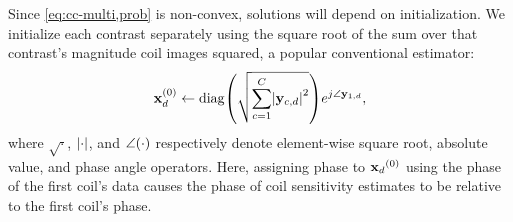 Since \eqref{eq:cc-multi,prob} is non-convex,
solutions will depend on initialization.
We initialize each contrast separately
using the square root of the sum 
over that contrast's magnitude coil images squared,
a popular conventional estimator:
\begin{align}
	\iter{\bmx}{0}_d \gets
		\diag{\sqrt{\sum_{c=1}^C \abs{\bmy_{c,d}}^2}}
		e^{j \angle{\bmy_{1,d}}},
	\label{eq:cc-multi,x-init}
\end{align}
where $\sqrt{\cdot}$, $\abs{\cdot}$, and $\angle{\paren{\cdot}}$
respectively denote 
element-wise square root, absolute value, and phase angle operators.
Here, assigning phase to $\iter{\bmx_d}{0}$
using the phase of the first coil's data
causes the phase 
of coil sensitivity estimates
to be relative to the first coil's phase.
